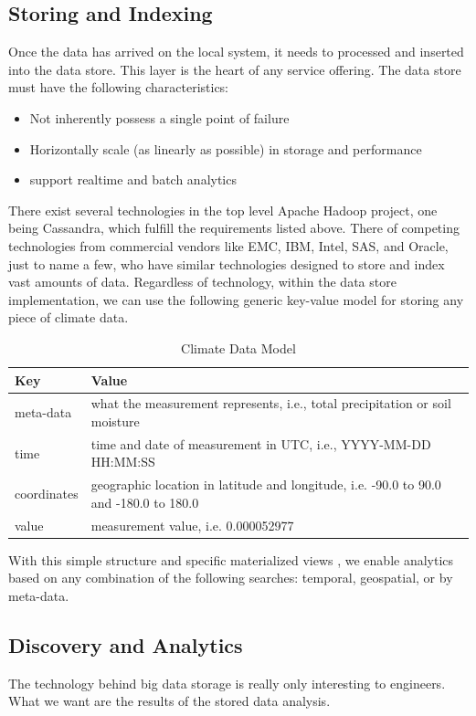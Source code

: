 \subsection{Storing and Indexing}
Once the data has arrived on the local system, it needs to processed and inserted into the data store. This layer is the heart of any service offering. The data store must have the following characteristics:
\begin{itemize}
	\item Not inherently possess a single point of failure
	\item Horizontally scale (as linearly as possible) in storage and performance
	\item support realtime and batch analytics
\end{itemize}
There exist several technologies in the top level Apache Hadoop project, one being Cassandra, which fulfill the requirements listed above\cite{cassandra}. There of competing technologies from commercial vendors like EMC, IBM, Intel, SAS, and Oracle, just to name a few, who have similar technologies designed to store and index vast amounts of data. Regardless of technology, within the data store implementation, we can use the following generic key-value model for storing any piece of climate data.
\begin{table}[htbp]
	\caption*{Climate Data Model}
	\centering
	\begin{tabular}{l l}
		\hline
		Key & Value \\ [0.5ex]
		\hline
		meta-data & what the measurement represents, i.e., total precipitation or soil moisture\\
		time & time and date of measurement in UTC, i.e., YYYY-MM-DD HH:MM:SS\\
		coordinates & geographic location in latitude and longitude, i.e. -90.0 to 90.0 and -180.0 to 180.0\\
		value & measurement value, i.e. 0.000052977\\
		\hline
	\end{tabular}
\end{table}
With this simple structure and specific materialized views \cite{materialized_views}, we enable analytics based on any combination of the following searches: temporal, geospatial, or by meta-data.

\subsection{Discovery and Analytics}
The technology behind big data storage is really only interesting to engineers. What we want are the results of the stored data analysis. 

